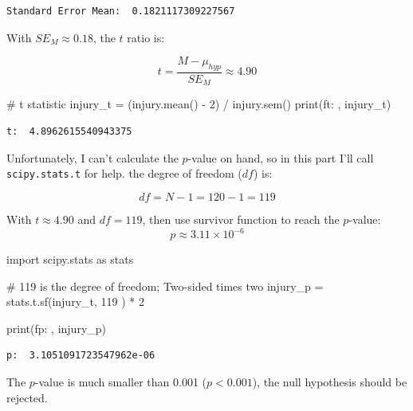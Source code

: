 \documentclass[
  a4paper,
  DIV=11,
  numbers=noendperiod]{scrartcl}
\newenvironment{Shaded}{\begin{snugshade}}{\end{snugshade}}
\newcommand{\BuiltInTok}[1]{\textcolor[rgb]{0.00,0.23,0.31}{#1}}
\newcommand{\CommentTok}[1]{\textcolor[rgb]{0.37,0.37,0.37}{#1}}
\newcommand{\DecValTok}[1]{\textcolor[rgb]{0.68,0.00,0.00}{#1}}
\newcommand{\ImportTok}[1]{\textcolor[rgb]{0.00,0.46,0.62}{#1}}
\newcommand{\NormalTok}[1]{\textcolor[rgb]{0.00,0.23,0.31}{#1}}
\newcommand{\OperatorTok}[1]{\textcolor[rgb]{0.37,0.37,0.37}{#1}}
\newcommand{\SpecialStringTok}[1]{\textcolor[rgb]{0.13,0.47,0.30}{#1}}
\begin{document}
\begin{verbatim}
Standard Error Mean:  0.1821117309227567
\end{verbatim}

With \(SE_M \approx 0.18\), the \(t\) ratio is:

\[
t = \frac{M - \mu_{hyp}}{SE_{M}} \approx 4.90
\]

\begin{Shaded}
\begin{Highlighting}[numbers=left,,]
\CommentTok{\# t statistic}
\NormalTok{injury\_t }\OperatorTok{=}\NormalTok{ (injury.mean() }\OperatorTok{{-}} \DecValTok{2}\NormalTok{) }\OperatorTok{/}\NormalTok{ injury.sem()}
\BuiltInTok{print}\NormalTok{(}\SpecialStringTok{f\textquotesingle{}t: \textquotesingle{}}\NormalTok{, injury\_t)}
\end{Highlighting}
\end{Shaded}

\begin{verbatim}
t:  4.8962615540943375
\end{verbatim}

Unfortunately, I can't calculate the \(p\)-value on hand, so in this
part I'll call \texttt{scipy.stats.t} for help. the degree of freedom
(\(df\)) is:

\[
df = N - 1 = 120 - 1 = 119
\]

With \(t \approx 4.90\) and \(df = 119\), then use survivor function to
reach the \(p\)-value: \[
p \approx 3.11 \times 10^{-6}
\]

\begin{Shaded}
\begin{Highlighting}[numbers=left,,]
\ImportTok{import}\NormalTok{ scipy.stats }\ImportTok{as}\NormalTok{ stats}

\CommentTok{\# 119 is the degree of freedom; Two{-}sided times two}
\NormalTok{injury\_p }\OperatorTok{=}\NormalTok{ stats.t.sf(injury\_t, }\DecValTok{119}\NormalTok{ ) }\OperatorTok{*} \DecValTok{2}

\BuiltInTok{print}\NormalTok{(}\SpecialStringTok{f\textquotesingle{}p: \textquotesingle{}}\NormalTok{, injury\_p)}
\end{Highlighting}
\end{Shaded}

\begin{verbatim}
p:  3.1051091723547962e-06
\end{verbatim}

The \(p\)-value is much smaller than 0.001 (\(p < 0.001\)), the null
hypothesis should be rejected.
\end{document}
